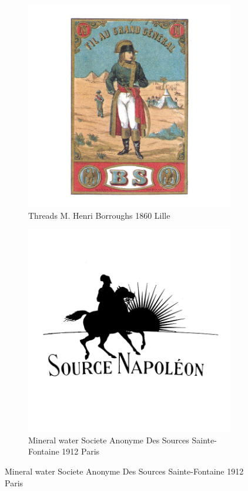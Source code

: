 \begin{figure}[h]
  \begin{subfigure}{.45\textwidth}
    \centering
    \includegraphics[width=.5\linewidth]{images/supplement/trademarks/french/6_21}
    \caption{Threads M. Henri Borroughs 1860 Lille}
    \label{fig:trademarks:french:6.21}
  \end{subfigure}\hfill
  \begin{subfigure}{.45\textwidth}
    \centering
    \includegraphics[width=.5\linewidth]{images/supplement/trademarks/french/6_24}
    \caption{Mineral water Societe Anonyme Des Sources Sainte-Fontaine 1912 Paris}
    \label{fig:trademarks:french:6.24}
  \end{subfigure}
\end{figure}

\clearpage

